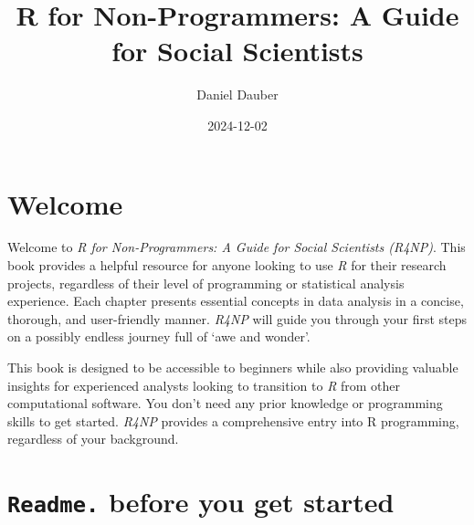 \documentclass[
  letterpaper,
]{krantz}
\title{R for Non-Programmers: A Guide for Social Scientists}
\author{Daniel Dauber}
\date{2024-12-02}
\renewcommand*\contentsname{Table of contents}
\newcommand\contentsname{Table of contents}
\begin{document}
\maketitle


\thispagestyle{empty}

\begin{center}
\end{center}

\setlength{\abovedisplayskip}{-5pt}
\setlength{\abovedisplayshortskip}{-5pt}

\renewcommand*\contentsname{Table of contents}
{
\hypersetup{linkcolor=}
\setcounter{tocdepth}{2}
\tableofcontents
}

\chapter*{Welcome}\label{welcome}


Welcome to \emph{R for Non-Programmers: A Guide for Social Scientists
(R4NP)}. This book provides a helpful resource for anyone looking to use
\emph{R} for their research projects, regardless of their level of
programming or statistical analysis experience. Each chapter presents
essential concepts in data analysis in a concise, thorough, and
user-friendly manner. \emph{R4NP} will guide you through your first
steps on a possibly endless journey full of `awe and wonder'.

This book is designed to be accessible to beginners while also providing
valuable insights for experienced analysts looking to transition to
\emph{R} from other computational software. You don't need any prior
knowledge or programming skills to get started. \emph{R4NP} provides a
comprehensive entry into R programming, regardless of your background.

\mainmatter


\chapter{\texorpdfstring{\texttt{Readme.} before you get
started}{Readme. before you get started}}\label{readme-before-you-get-started}
\end{document}
